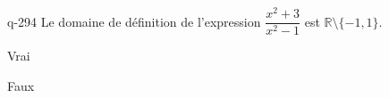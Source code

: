 \begin{truefalse}{q-294}
Le domaine de définition de l'expression $\dfrac{x^2+3}{x^2-1}$ est $\mathbb R \setminus \{-1,1\}$.
\item* Vrai
\item Faux
\end{truefalse}

